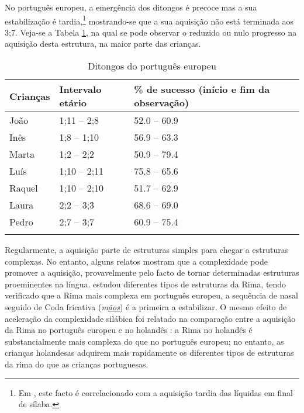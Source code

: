 \documentclass[output=paper]{LSP/langsci}
\begin{document}
No português europeu, a emergência dos ditongos é precoce mas a sua estabilização é tardia,\footnote{Em \citet{freitas1997}, este facto é correlacionado com a aquisição tardia das líquidas em final de sílaba.} mostrando-se que a sua aquisição não está terminada aos 3;7. Veja-se a Tabela \ref{tab:freitas_ditongos_ep}, na qual se pode observar o reduzido ou nulo progresso na aquisição desta estrutura, na maior parte das crianças.

\begin{table}
\begin{tabular}{lll}
\lsptoprule
Crianças & Intervalo etário & \% de sucesso (início e fim da observação) \\
\midrule
João     & 1;11 -- 2;8      & 52.0 -- 60.9                               \\
Inês     & 1;8 -- 1;10      & 56.9 -- 63.3                               \\
Marta    & 1;2 -- 2;2       & 50.9 -- 79.4                               \\
Luís     & 1;10 -- 2;11     & 75.8 -- 65.6                               \\
Raquel   & 1;10 -- 2;10     & 51.7 -- 62.9                               \\
Laura    & 2;2 -- 3;3       & 68.6 -- 69.0                               \\
Pedro    & 2;7 -- 3;7       & 60.9 -- 75.4 \\                             
\lspbottomrule
\end{tabular}
  \caption{Ditongos do português europeu \citep{freitas1997}}
  \label{tab:freitas_ditongos_ep}
\end{table}

Regularmente, a aquisição parte de estruturas simples para chegar a estruturas complexas. No entanto, alguns relatos mostram que a complexidade pode promover a aquisição, provavelmente pelo facto de tornar determinadas estruturas proeminentes na língua. \citet{correia2004} estudou diferentes tipos de estruturas da Rima, tendo verificado que a Rima mais complexa em português europeu, a sequência de  nasal seguido de Coda fricativa (\textit{m\underline{ãos}}) é a primeira a estabilizar. O mesmo efeito de aceleração da complexidade silábica foi relatado na comparação entre a aquisição da Rima no português europeu e no holandês \citep{fikkertfreitas1998}: a Rima no holandês é substancialmente mais complexa do que no português europeu; no entanto, as crianças holandesas adquirem mais rapidamente os diferentes tipos de estruturas da rima do que as crianças portuguesas.
\end{document}
